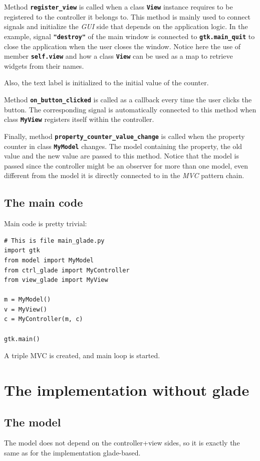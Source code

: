 \documentclass{article}
\newcommand{\kw}[1]{\emph{#1}\xspace}
\newcommand{\mvc}{\kw{MVC} pattern\xspace}
\newcommand{\gui}{\kw{GUI}}
\newcommand{\codename}[1]{\texttt{\bfseries \textcolor {codecolor}{#1}}\xspace}
\newcommand{\codesize}{\small } %
\begin{document}
Method \codename{register\_view} is called when a class
\codename{View} instance requires to be registered to the controller
it belongs to. This method is mainly used to connect signals and
initialize the \gui side that depends on the application logic. In
the example, signal \codename{"destroy"} of the main window is
connected to \codename{gtk.main\_quit} to close the application when
the user closes the window. Notice here the use of member
\codename{self.view} and how a class \codename{View} can be used as
a map to retrieve widgets from their names.

Also, the text label is initialized to the initial value of the
counter.

Method \codename{on\_button\_clicked} is called as a callback every
time the user clicks the button. The corresponding signal is
automatically connected to this method when class \codename{MyView}
registers itself within the controller.

Finally, method \codename{property\_counter\_value\_change} is
called when the property counter in class \codename{MyModel}
changes. The model containing the property, the old value and the
new value are passed to this method. Notice that the model is passed
since the controller might be an observer for more than one model,
even different from the model it is directly connected to in the
\mvc chain.


\subsection{The main code}
Main code is pretty trivial:
  
{ \codesize 
\begin{verbatim}   
# This is file main_glade.py
import gtk
from model import MyModel
from ctrl_glade import MyController
from view_glade import MyView

m = MyModel()
v = MyView()
c = MyController(m, c)

gtk.main()
\end{verbatim}
} 

A triple MVC is created, and main loop is started. 


\section{The implementation without glade}

\subsection{The model}
The model does not depend on the controller+view sides, so it is
exactly the same as for the implementation glade-based.
\end{document}
